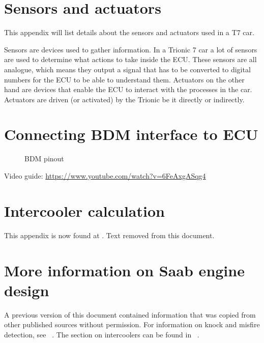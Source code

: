 \documentclass[11pt,a4paper]{book}
\newcommand{\Mfig}[1]{%
\begin{figure}
    \centering
    \missingfigure{#1}
    \caption{#1}
\end{figure}}
\begin{document}
\chapter{Sensors and actuators}
This appendix will list details about the sensors and actuators used in a T7 car.

Sensors are devices used to gather information. In a Trionic 7 car a lot of
sensors are used to determine what actions to take inside the ECU. These sensors
are all analogue, which means they output a signal that has to be converted to
digital numbers for the ECU to be able to understand them. Actuators on the
other hand are devices that enable the ECU to interact with the processes in the
car. Actuators are driven (or activated) by the Trionic be it directly or
indirectly.

\chapter{Connecting BDM interface to ECU}
\Mfig{BDM pinout}

Video guide: \url{https://www.youtube.com/watch?v=6FeAxgASqg4}

\chapter{Intercooler calculation}
This appendix is now found at \textcite{Estill}. Text removed from this
document.

\chapter{More information on Saab engine design}
A previous version of this document contained information that was copied
from other published sources without permission. For information on knock and
misfire detection, see
\citeauthor{eriksson_closed_1998}~\cite{eriksson_closed_1998}. The section on
intercoolers can be found in
\citeauthor{ferozepuria_turbocharger}~\cite{ferozepuria_turbocharger}.
\printindex

\printbibliography
\end{document}
